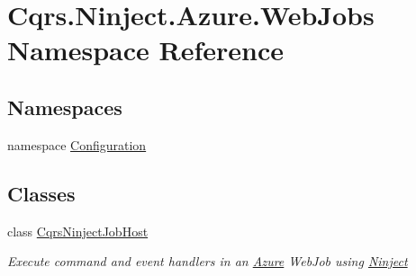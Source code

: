 \hypertarget{namespaceCqrs_1_1Ninject_1_1Azure_1_1WebJobs}{}\section{Cqrs.\+Ninject.\+Azure.\+Web\+Jobs Namespace Reference}
\label{namespaceCqrs_1_1Ninject_1_1Azure_1_1WebJobs}
\subsection*{Namespaces}
\begin{DoxyCompactItemize}
\item 
namespace \hyperlink{namespaceCqrs_1_1Ninject_1_1Azure_1_1WebJobs_1_1Configuration}{Configuration}
\end{DoxyCompactItemize}
\subsection*{Classes}
\begin{DoxyCompactItemize}
\item 
class \hyperlink{classCqrs_1_1Ninject_1_1Azure_1_1WebJobs_1_1CqrsNinjectJobHost}{Cqrs\+Ninject\+Job\+Host}
\begin{DoxyCompactList}\small\item\em Execute command and event handlers in an \hyperlink{namespaceCqrs_1_1Ninject_1_1Azure}{Azure} Web\+Job using \hyperlink{namespaceCqrs_1_1Ninject}{Ninject} \end{DoxyCompactList}\end{DoxyCompactItemize}

